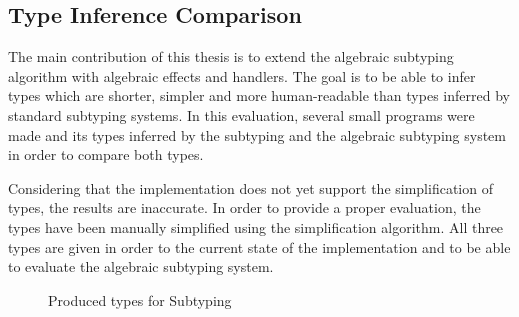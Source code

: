 \subsection{Type Inference Comparison}

The main contribution of this thesis is to extend the algebraic subtyping algorithm with algebraic effects and handlers. The goal is to be able to infer types which are shorter, simpler and more human-readable than types inferred by standard subtyping systems. In this evaluation, several small programs were made and its types inferred by the subtyping and the algebraic subtyping system in order to compare both types. 

Considering that the implementation does not yet support the simplification of types, the results are inaccurate. In order to provide a proper evaluation, the types have been manually simplified using the simplification algorithm. All three types are given in order to the current state of the implementation and to be able to evaluate the algebraic subtyping system.



\begin{figure}[H]
\begin{center}
\begin{framed}
\begin{minipage}[t]{0.95\columnwidth}
    \begin{mathpar}




\end{mathpar}
\end{minipage}
\end{framed}
\end{center}
\caption{Produced types for Subtyping}\label{fig:inferred:sub}
\end{figure}

